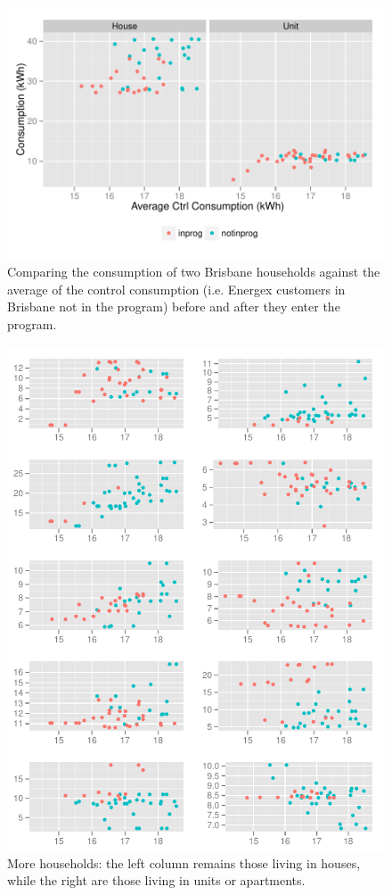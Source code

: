 \documentclass[a4paper,11pt]{article}
\begin{document}
\begin{figure}
\begin{center}
\includegraphics[width=1\textwidth]{figures/BrisSamp1.pdf}
\caption{Comparing the consumption of two Brisbane households against the
average of the control consumption (i.e. Energex customers in Brisbane not
in the program) before and after they enter the program.}
\end{center}
\end{figure}

\begin{figure}
\begin{center}
\includegraphics[width=1\textwidth]{figures/BrisSamp2.pdf}
\caption{More households: the left column remains those living in houses,
while the right are those living in units or apartments.}
\end{center}
\end{figure}
\end{document}

